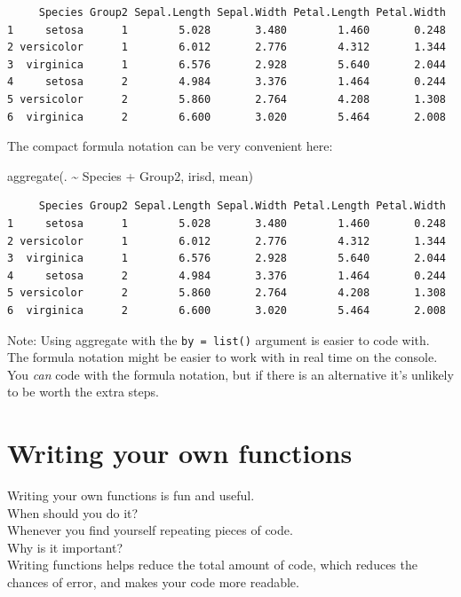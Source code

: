 \documentclass[
]{book}
\newenvironment{Shaded}{\begin{snugshade}}{\end{snugshade}}
\newcommand{\FunctionTok}[1]{\textcolor[rgb]{0.00,0.00,0.00}{#1}}
\newcommand{\NormalTok}[1]{#1}
\newcommand{\SpecialCharTok}[1]{\textcolor[rgb]{0.00,0.00,0.00}{#1}}
\begin{document}
\begin{verbatim}
     Species Group2 Sepal.Length Sepal.Width Petal.Length Petal.Width
1     setosa      1        5.028       3.480        1.460       0.248
2 versicolor      1        6.012       2.776        4.312       1.344
3  virginica      1        6.576       2.928        5.640       2.044
4     setosa      2        4.984       3.376        1.464       0.244
5 versicolor      2        5.860       2.764        4.208       1.308
6  virginica      2        6.600       3.020        5.464       2.008
\end{verbatim}

The compact formula notation can be very convenient here:

\begin{Shaded}
\begin{Highlighting}[]
\FunctionTok{aggregate}\NormalTok{(. }\SpecialCharTok{\textasciitilde{}}\NormalTok{ Species }\SpecialCharTok{+}\NormalTok{ Group2, irisd, mean)}
\end{Highlighting}
\end{Shaded}

\begin{verbatim}
     Species Group2 Sepal.Length Sepal.Width Petal.Length Petal.Width
1     setosa      1        5.028       3.480        1.460       0.248
2 versicolor      1        6.012       2.776        4.312       1.344
3  virginica      1        6.576       2.928        5.640       2.044
4     setosa      2        4.984       3.376        1.464       0.244
5 versicolor      2        5.860       2.764        4.208       1.308
6  virginica      2        6.600       3.020        5.464       2.008
\end{verbatim}

Note: Using aggregate with the \texttt{by\ =\ list()} argument is easier to code with. The formula notation might be easier to work with in real time on the console. You \emph{can} code with the formula notation, but if there is an alternative it's unlikely to be worth the extra steps.

\hypertarget{functions}{%
\chapter{Writing your own functions}\label{functions}}

Writing your own functions is fun and useful.\\
When should you do it?\\
Whenever you find yourself repeating pieces of code.\\
Why is it important?\\
Writing functions helps reduce the total amount of code, which reduces the chances of error, and makes your code more readable.
\end{document}
